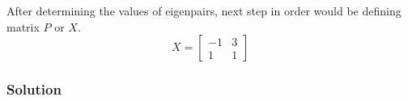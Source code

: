 After determining the values of eigenpairs, next step in order would be defining matrix $P$ or $X$.
\begin{equation*}
    X = 
    \begin{bmatrix}
        -1 & 3 \\
         1 & 1
    \end{bmatrix} 
\end{equation*} 



\subsubsection*{Solution}
